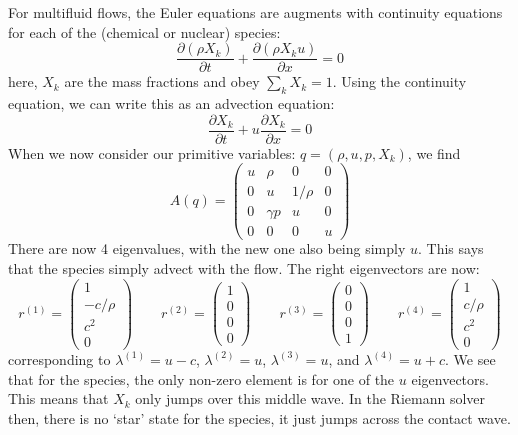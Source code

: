For multifluid flows, the Euler equations are
augments with continuity equations for each of the (chemical or nuclear)
species:
\begin{equation}
\frac{\partial (\rho X_k)}{\partial t} + \frac{\partial (\rho X_k u)}{\partial x} = 0
\end{equation}
here, $X_k$ are the mass fractions and obey $\sum_k X_k = 1$.  Using the
continuity equation, we can write this as an advection equation:
\begin{equation}
\frac{\partial X_k}{\partial t} + u \frac{\partial X_k}{\partial x} = 0
\end{equation}
When we now consider our primitive variables: $q = (\rho, u, p, X_k)$,
we find
\begin{equation}
A(q) = \left ( \begin{array}{cccc} u  & \rho     & 0      &  0\\
                                  0  &  u       & 1/\rho &  0\\
                                  0  & \gamma p & u      &  0\\
                                  0  & 0        & 0      & u \end{array} \right )
\end{equation}
There are now 4 eigenvalues, with the new one also being simply $u$.
This says that the species simply advect with the flow.  The right
eigenvectors are now:
\begin{equation}
r^{(1)} = \left ( \begin{array}{c} 1 \\ -c/\rho \\ c^2 \\ 0\end{array} \right )
%
\qquad
r^{(2)} = \left ( \begin{array}{c} 1 \\ 0 \\ 0  \\ 0\end{array} \right )
%
\qquad
r^{(3)} = \left ( \begin{array}{c} 0 \\ 0  \\ 0 \\ 1 \end{array} \right )
%
\qquad
r^{(4)} = \left ( \begin{array}{c} 1 \\ c/\rho \\ c^2 \\ 0 \end{array} \right )
\end{equation}
corresponding to $\lambda^{(1)} = u -c$, $\lambda^{(2)} = u$,
$\lambda^{(3)} = u$, and $\lambda^{(4)} = u + c$.  We see that for the
species, the only non-zero element is for one of the $u$ eigenvectors.
This means that $X_k$ only jumps over this middle wave.  In the
Riemann solver then, there is no `star' state for the species, it just
jumps across the contact wave.

